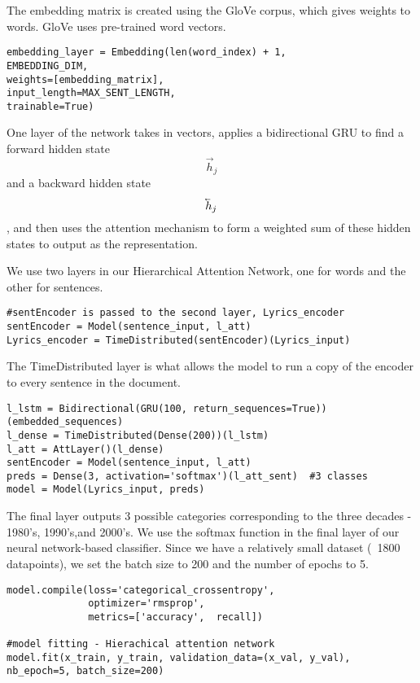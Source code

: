 \documentclass[a4paper,11pt,twocolumn]{article}
\newcommand{\cev}[1]{\reflectbox{\ensuremath{\vec{\reflectbox{\ensuremath{#1}}}}}}
\begin{document}
The embedding matrix is created using the GloVe corpus, which gives weights to words. GloVe uses pre-trained word vectors.
\begin{lstlisting}
embedding_layer = Embedding(len(word_index) + 1,
EMBEDDING_DIM,
weights=[embedding_matrix],
input_length=MAX_SENT_LENGTH,
trainable=True)
\end{lstlisting}


One layer of the network takes in vectors, applies a bidirectional GRU to find a forward hidden state \[\vec{h}_j\]
and a backward hidden state \[\cev{h}_j\] , and then uses the attention mechanism to form a weighted sum of these hidden states to output as the representation.

We use two layers in our Hierarchical Attention Network, one for words and the other for sentences.

\begin{lstlisting}
#sentEncoder is passed to the second layer, Lyrics_encoder
sentEncoder = Model(sentence_input, l_att)
Lyrics_encoder = TimeDistributed(sentEncoder)(Lyrics_input)
\end{lstlisting}

The TimeDistributed layer is what allows the model to run a copy of the encoder to every sentence in the document.



\begin{lstlisting}
l_lstm = Bidirectional(GRU(100, return_sequences=True))(embedded_sequences)
l_dense = TimeDistributed(Dense(200))(l_lstm)
l_att = AttLayer()(l_dense)
sentEncoder = Model(sentence_input, l_att)
preds = Dense(3, activation='softmax')(l_att_sent)	#3 classes
model = Model(Lyrics_input, preds)
\end{lstlisting}

The final layer outputs 3 possible categories corresponding to the three decades - 1980's, 1990's,and 2000's. We use the softmax function in the final layer of our neural network-based classifier. Since we have a relatively small dataset (~1800 datapoints), we set the batch size to 200 and the number of epochs to 5.

\begin{lstlisting}
model.compile(loss='categorical_crossentropy',
			  optimizer='rmsprop',
			  metrics=['accuracy',  recall])

#model fitting - Hierachical attention network
model.fit(x_train, y_train, validation_data=(x_val, y_val), nb_epoch=5, batch_size=200)
\end{lstlisting}
\end{document}
